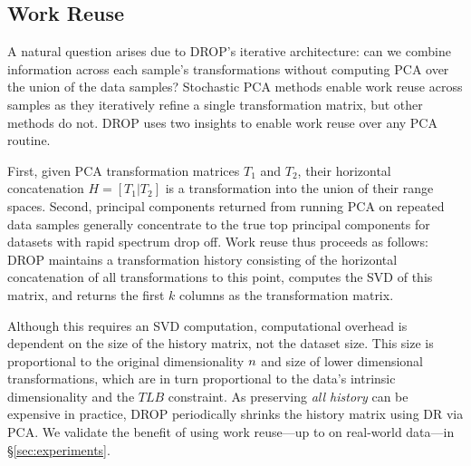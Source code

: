 \subsection{Work Reuse}
\label{subsec:reuse}

A natural question arises due to DROP's iterative architecture: can we combine information across each sample's transformations without computing PCA over the union of the data samples? 
Stochastic PCA methods enable work reuse across samples as they iteratively refine a single transformation matrix, but other methods do not.
DROP uses two insights to enable work reuse over any PCA routine.

First, given PCA transformation matrices $T_1$ and $T_2$, their horizontal concatenation $H = [T_1 | T_2]$ is a transformation into the union of their range spaces.
Second, principal components returned from running PCA on repeated data samples generally concentrate to the true top principal components for datasets with rapid spectrum drop off.
Work reuse thus proceeds as follows:
DROP maintains a transformation history consisting of the horizontal concatenation of all transformations to this point, computes the SVD of this matrix, and returns the first $k$ columns as the transformation matrix. 

Although this requires an SVD computation, computational overhead is dependent on the size of the history matrix, not the dataset size.
This size is proportional to the original dimensionality ${\color{black}n}$ and size of lower dimensional transformations, which are in turn proportional to the data's intrinsic dimensionality and the $TLB$ constraint.
As preserving \emph{all history} can be expensive in practice, 
DROP periodically shrinks the history matrix using DR via PCA. 
We validate the benefit of using work reuse---up to  on real-world data---in \S\ref{sec:experiments}.

